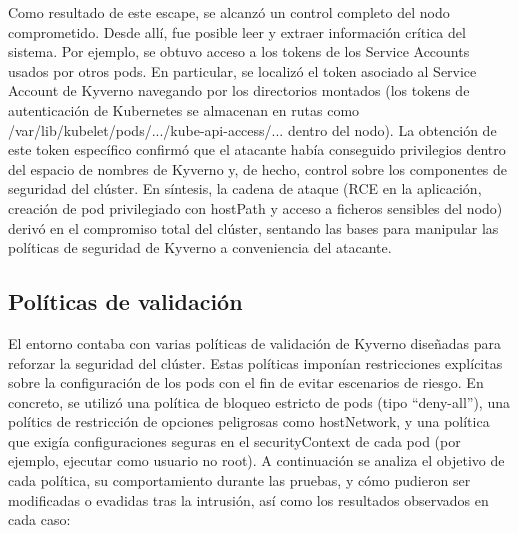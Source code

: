 \documentclass[12pt,twoside,titlepage]{report}
\begin{document}
Como resultado de este escape, se alcanzó un control completo del nodo comprometido. Desde allí, fue posible leer y extraer información crítica del sistema. Por ejemplo, se obtuvo acceso a los tokens de los Service Accounts usados por otros pods. En particular, se localizó el token asociado al Service Account de Kyverno navegando por los directorios montados (los tokens de autenticación de Kubernetes se almacenan en rutas como /var/lib/kubelet/pods/.../kube-api-access/... dentro del nodo). La obtención de este token específico confirmó que el atacante había conseguido privilegios dentro del espacio de nombres de Kyverno y, de hecho, control sobre los componentes de seguridad del clúster. En síntesis, la cadena de ataque (RCE en la aplicación, creación de pod privilegiado con hostPath y acceso a ficheros sensibles del nodo) derivó en el compromiso total del clúster, sentando las bases para manipular las políticas de seguridad de Kyverno a conveniencia del atacante.
\subsection{Políticas de validación}
El entorno contaba con varias políticas de validación de Kyverno diseñadas para reforzar la seguridad del clúster. Estas políticas imponían restricciones explícitas sobre la configuración de los pods con el fin de evitar escenarios de riesgo. En concreto, se utilizó una política de bloqueo estricto de pods (tipo “deny-all”), una polítics de restricción de opciones peligrosas como  hostNetwork, y una política que exigía configuraciones seguras en el securityContext de cada pod (por ejemplo, ejecutar como usuario no root). A continuación se analiza el objetivo de cada política, su comportamiento durante las pruebas, y cómo pudieron ser modificadas o evadidas tras la intrusión, así como los resultados observados en cada caso:
\end{document}
